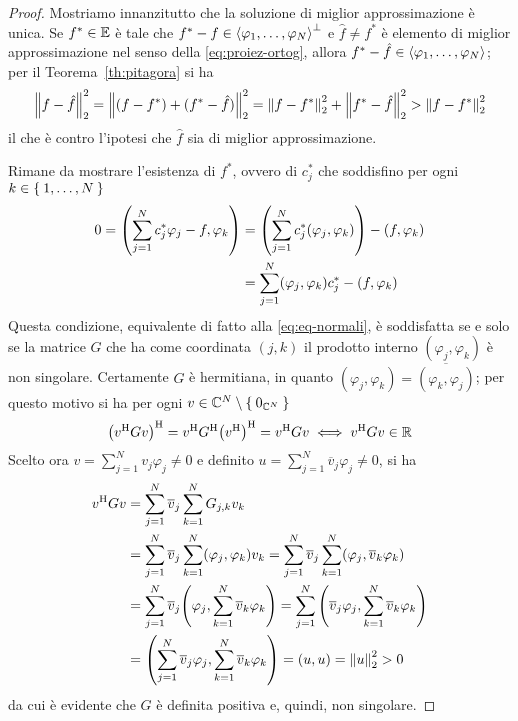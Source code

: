 	\begin{proof}
		Mostriamo innanzitutto che la soluzione di miglior approssimazione è unica. Se \(f^* \in \mathbb{E}\) è tale che \(f^* - f \in \Braket{\varphi_1, \dots, \varphi_N}^\perp\) e \(\hat{f} \ne f^*\) è elemento di miglior approssimazione nel senso della \eqref{eq:proiez-ortog}, allora \(f^* - \hat{f} \in \Braket{\varphi_1, \dots, \varphi_N}\); per il Teorema~\ref{th:pitagora} si ha
		\begin{equation*}
			\norm{f - \hat{f}}_2^2 = \norm{(f - f^*) + (f^* - \hat{f})}_2^2 = \norm{f - f^*}_2^2 + \norm{f^* - \hat{f}}_2^2 > \norm{f - f^*}_2^2
		\end{equation*}
		il che è contro l'ipotesi che \(\hat{f}\) sia di miglior approssimazione.
		
		Rimane da mostrare l'esistenza di \(f^*\), ovvero di \(c_j^*\) che soddisfino per ogni \(k \in \Set{1, \dots, N}\)
		\begin{equation*}
			\begin{split}
				0 = \qty(\sum_{j = 1}^N c_j^* \varphi_j - f, \varphi_k) &= \qty(\sum_{j = 1}^N c_j^* (\varphi_j, \varphi_k)) - (f, \varphi_k) \\
				&= \sum_{j = 1}^N (\varphi_j, \varphi_k) c_j^* - (f, \varphi_k)
			\end{split}
		\end{equation*}
		Questa condizione, equivalente di fatto alla \eqref{eq:eq-normali}, è soddisfatta se e solo se la matrice \(G\) che ha come coordinata \((j, k)\) il prodotto interno \((\varphi_j, \varphi_k)\) è non singolare. Certamente \(G\) è hermitiana, in quanto \((\varphi_j, \varphi_k) = \overline{(\varphi_k, \varphi_j)}\); per questo motivo si ha per ogni \(v \in \mathbb{C}^N \setminus \Set{0_{\mathbb{C}^N}}\)
		\begin{equation*}
			\qty(v^\mathrm{H} G v)^\mathrm{H} = v^\mathrm{H} G^\mathrm{H} \qty(v^\mathrm{H})^\mathrm{H} = v^\mathrm{H} G v \iff v^\mathrm{H} G v \in \mathbb{R}
		\end{equation*}
		Scelto ora \(v = \sum_{j = 1}^N v_j \varphi_j \ne 0\) e definito \(u = \sum_{j = 1}^N \overline{v}_j \varphi_j \ne 0\), si ha
		\begin{equation*}
			\begin{split}
				v^\mathrm{H} G v &= \sum_{j = 1}^N \overline{v}_j \sum_{k = 1}^N G_{j, k} v_k \\
				&= \sum_{j = 1}^N \overline{v}_j \sum_{k = 1}^N (\varphi_j, \varphi_k) v_k = \sum_{j = 1}^N \overline{v}_j \sum_{k = 1}^N (\varphi_j, \overline{v}_k \varphi_k) \\
				&= \sum_{j = 1}^N \overline{v}_j \qty(\varphi_j, \sum_{k = 1}^N \overline{v}_k \varphi_k) = \sum_{j = 1}^N \qty(\overline{v}_j \varphi_j, \sum_{k = 1}^N \overline{v}_k \varphi_k) \\
				&= \qty(\sum_{j = 1}^N \overline{v}_j \varphi_j, \sum_{k = 1}^N \overline{v}_k \varphi_k) = (u, u) = \norm{u}_2^2 > 0
			\end{split}
		\end{equation*}
		da cui è evidente che \(G\) è definita positiva e, quindi, non singolare.
	\end{proof}

